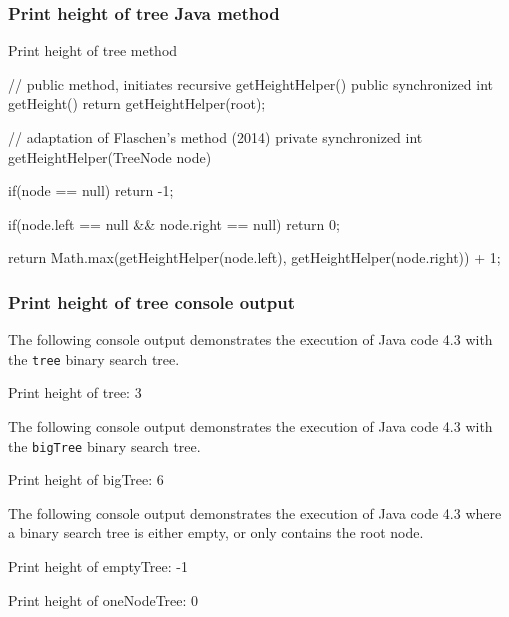 \subsubsection{Print height of tree Java method}

\begin{listing}[H]
\caption{Print height of tree method}
\begin{javacode}
// public method, initiates recursive getHeightHelper()
public synchronized int getHeight() {
    return getHeightHelper(root);
}

// adaptation of Flaschen's method (2014)
private synchronized int getHeightHelper(TreeNode node) {
    if(node == null) {
        return -1;
    }

    if(node.left == null && node.right == null) {
        return 0;
    }

    return Math.max(getHeightHelper(node.left), getHeightHelper(node.right)) + 1;
}
\end{javacode}
\end{listing}

\subsubsection{Print height of tree console output}

The following console output demonstrates the execution of Java code 4.3 with the \texttt{tree} binary search tree.
\\
\begin{consolecode}
Print height of tree:
3
\end{consolecode}

\noindent
The following console output demonstrates the execution of Java code 4.3 with the \texttt{bigTree} binary search tree.
\\
\begin{consolecode}
Print height of bigTree:
6
\end{consolecode}

\noindent
The following console output demonstrates the execution of Java code 4.3 where a binary search tree is either empty, or only contains the root node.
\\
\begin{consolecode}
Print height of emptyTree:
-1

Print height of oneNodeTree:
0
\end{consolecode}